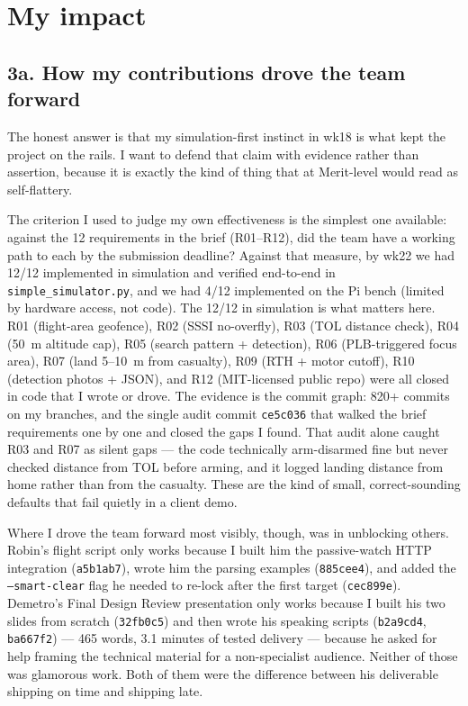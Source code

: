 \section{My impact}

\subsection*{3a. How my contributions drove the team forward}

The honest answer is that my simulation-first instinct in wk18 is what kept the project on the rails. I want to defend that claim with evidence rather than assertion, because it is exactly the kind of thing that at Merit-level would read as self-flattery.

The criterion I used to judge my own effectiveness is the simplest one available: against the 12 requirements in the brief (R01--R12), did the team have a working path to each by the submission deadline? Against that measure, by wk22 we had 12/12 implemented in simulation and verified end-to-end in \texttt{simple\_simulator.py}, and we had 4/12 implemented on the Pi bench (limited by hardware access, not code). The 12/12 in simulation is what matters here. R01 (flight-area geofence), R02 (SSSI no-overfly), R03 (TOL distance check), R04 (50~m altitude cap), R05 (search pattern + detection), R06 (PLB-triggered focus area), R07 (land 5--10~m from casualty), R09 (RTH + motor cutoff), R10 (detection photos + JSON), and R12 (MIT-licensed public repo) were all closed in code that I wrote or drove. The evidence is the commit graph: 820+ commits on my branches, and the single audit commit \texttt{ce5c036} that walked the brief requirements one by one and closed the gaps I found. That audit alone caught R03 and R07 as silent gaps --- the code technically arm-disarmed fine but never checked distance from TOL before arming, and it logged landing distance from home rather than from the casualty. These are the kind of small, correct-sounding defaults that fail quietly in a client demo.

Where I drove the team forward most visibly, though, was in unblocking others. Robin's flight script only works because I built him the passive-watch HTTP integration (\texttt{a5b1ab7}), wrote him the parsing examples (\texttt{885cee4}), and added the \texttt{--smart-clear} flag he needed to re-lock after the first target (\texttt{cec899e}). Demetro's Final Design Review presentation only works because I built his two slides from scratch (\texttt{32fb0c5}) and then wrote his speaking scripts (\texttt{b2a9cd4}, \texttt{ba667f2}) --- 465 words, 3.1 minutes of tested delivery --- because he asked for help framing the technical material for a non-specialist audience. Neither of those was glamorous work. Both of them were the difference between his deliverable shipping on time and shipping late.


